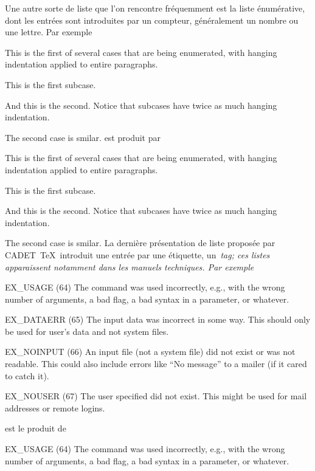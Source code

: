 Une autre sorte de liste que l'on rencontre fréquemment est la liste
énumérative, dont les entrées sont introduites par un compteur,
généralement un nombre ou une lettre. Par exemple
\begindisplay
{}
\beginlist\enum\1
\item This is the first of several cases that are being enumerated,
      with hanging indentation applied to entire paragraphs.
\beginlist\enum\a
\item This is the first subcase.
\item And this is the second. Notice that subcases have twice as much
      hanging indentation.
\endlist
\item The second case is smilar.
\endlist
\enddisplay
est produit par
\begincode
{}
\beginlist\enum\1
\item This is the first of several cases that are being enumerated,
      with hanging indentation applied to entire paragraphs.
\beginlist\enum\a
\item This is the first subcase.
\item And this is the second. Notice that subcases have twice as much
      hanging indentation.
\endlist
\item The second case is smilar.
\endlist
\endcode
La dernière présentation de liste proposée par CADET~\TeX\ introduit
une entrée par une étiquette, un~\em{tag}; ces listes apparaissent
notamment dans les manuels techniques. Par exemple
\begindisplay
{}
\beginlist\tag
\item{EX\_USAGE (64)}
The command was used incorrectly, e.g., with the wrong number of
arguments, a bad flag, a bad syntax in a parameter, or whatever.

\item{EX\_DATAERR (65)}
The input data was incorrect in some way.  This should only be used
for user's data and not system files.

\item{EX\_NOINPUT (66)}
An input file (not a system file) did not exist or was not readable.
This could also include errors like ``No message'' to a mailer (if it
cared to catch it).

\item{EX\_NOUSER (67)}
The user specified did not exist.  This might be used for mail
addresses or remote logins.

\endlist
\enddisplay
est le produit de
\begincode
{}
\beginlist\tag
\item{EX\_USAGE (64)}
The command was used incorrectly, e.g., with the wrong number of
arguments, a bad flag, a bad syntax in a parameter, or whatever.

